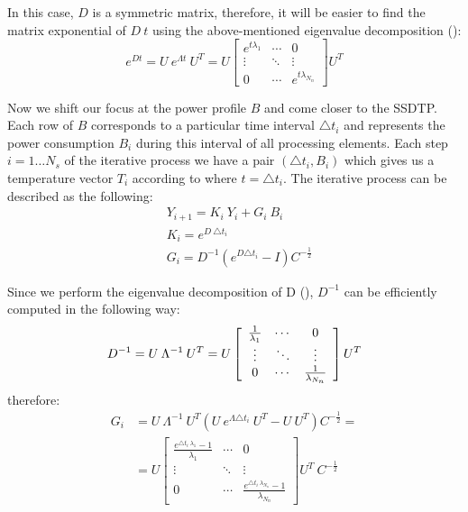 In this case, $D$ is a symmetric matrix, therefore, it will be easier to find the matrix exponential of $D \: t$ using the above-mentioned eigenvalue decomposition ():
\[
  e^{D t} = U \: e^{\Lambda t} \: U^T = U \left[
      \begin{array}{ccc}
        e^{t \lambda_1} & \cdots & 0 \\
        \vdots & \ddots & \vdots \\
        0 & \cdots & e^{t \lambda_{N_n}}
      \end{array}
    \right] U^T
\]

Now we shift our focus at the power profile $B$ and come closer to the SSDTP. Each row of $B$ corresponds to a particular time interval $\triangle t_i$ and represents the power consumption $B_i$ during this interval of all processing elements. Each step $i = 1 \dots N_s$ of the iterative process we have a pair $(\triangle t_i, B_i)$ which gives us a temperature vector $T_i$ according to  where $t = \triangle t_i$. The iterative process can be described as the following:
\begin{align}
  & Y_{i+1} = K_i \: Y_i + G_i \: B_i \label{eq:recurrent-equation} \\
  & K_i = e^{D \: \triangle t_i} \nonumber \\
  & G_i = D^{-1} \left( e^{D \triangle t_i} - I \right) C^{-\frac{1}{2}} \nonumber
\end{align}

Since we perform the eigenvalue decomposition of D (), $D^{-1}$ can be efficiently computed in the following way:
\[
  D^{-1} = U \: \Lambda^{-1} \: U^T = U \left[
      \begin{array}{ccc}
        \frac{1}{\lambda_1} & \cdots & 0 \\
        \vdots & \ddots & \vdots \\
        0 & \cdots & \frac{1}{\lambda_{N_n}}
      \end{array}
    \right] U^T \\
\]
therefore:
\begin{align*}
  G_i & = U \: \Lambda^{-1} \: U^T \left(U \: e^{\Lambda \triangle t_i} \: U^T - U \: U^T \right) C^{-\frac{1}{2}} = \\
      & = U \left[
        \begin{array}{ccc}
          \frac{e^{\triangle t_i \: \lambda_1} - 1}{\lambda_1} & \cdots & 0 \\
          \vdots & \ddots & \vdots \\
          0 & \cdots & \frac{e^{\triangle t_i \: \lambda_{N_n}} - 1}{\lambda_{N_n}}
        \end{array}
      \right] U^T \: C^{-\frac{1}{2}}
\end{align*}


